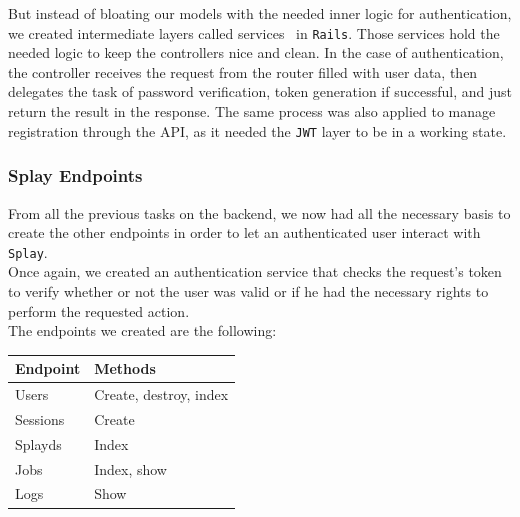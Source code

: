 \documentclass{eplmastersthesis}
\begin{document}
          But instead of bloating our models with the needed inner logic for
          authentication, we created intermediate layers called services~\cite{fatmod}
          in \texttt{Rails}. Those services hold the needed logic to keep the controllers
          nice and clean. In the case of authentication, the controller receives
          the request from the router filled with user data, then delegates
          the task of password verification, token generation if successful,
          and just return the result in the response. The same process was also
          applied to manage registration through the API, as it needed the \texttt{JWT}
          layer to be in a working state.

        \subsubsection{Splay Endpoints}

          From all the previous tasks on the backend, we now had all the
          necessary basis to create the other endpoints in order to let
          an authenticated user interact with \texttt{Splay}.\\

          Once again, we created an authentication service that checks
          the request's token to verify whether or not the user was valid or
          if he had the necessary rights to perform the requested action.\\

          The endpoints we created are the following:

          \begin{table}[H] %
            \begin{tabular}{|l|l|}
            \hline
            \textbf{Endpoint} & \textbf{Methods}       \\ \hline
            Users             & Create, destroy, index \\
            Sessions          & Create                 \\
            Splayds           & Index                  \\
            Jobs              & Index, show            \\
            Logs              & Show                   \\ \hline
            \end{tabular}
          \end{table}
\end{document}
